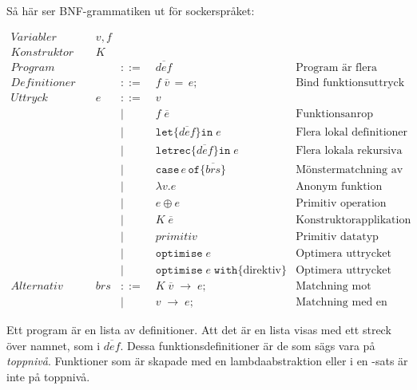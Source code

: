 \documentclass[Rapport]{subfiles}
\begin{document}
Så här ser BNF-grammatiken ut för sockerspråket:


\begin{equation*}
\begin{aligned}
Variabler \quad & v,f \\
Konstruktor \quad & K \\
Program \quad&&::=&\; \overline{def} 
        & \text{Program är flera definitioner}\\ 
Definitioner  \quad && ::=&\; f \; \overline{v} \, \mathtt{=} \, e \mathtt{;} 
        & \text {Bind funktionsuttryck}\\
Uttryck \quad & e &::=&\;  v \\
       &&|&\; f \; \overline{e}  
            & \text{Funktionsanrop} \\ 
       &&|&\; \mathtt{let \{} \overline{def} \mathtt{\} in }\; e 
            & \text{Flera lokal definitioner}\\
       &&|&\; \mathtt{letrec \{} \overline{def} \mathtt{\} in} \; e 
            & \text{Flera lokala rekursiva definitioner} \\
       &&|&\; \mathtt{case} \, e \, \mathtt{of \{} \overline{brs} \mathtt{\}} 
            & \text{Mönstermatchning av uttryck} \\
       &&|&\; \mathtt{\lambda } v \mathtt{.} e
            & \text{Anonym funktion} \\
       &&|&\; e \oplus e 
            & \text{Primitiv operation}\\ 
       &&|&\; K \; \overline{e} 
            & \text{Konstruktorapplikation} \\
       &&|&\; primitiv 
            & \text{Primitiv datatyp} \\
       &&|&\; \mathtt{optimise} \; e 
            & \text{Optimera uttrycket} \\
       &&|&\; \mathtt{optimise } \; e \; \mathtt{ with \{} \text{direktiv} \} 
            & \text{Optimera uttrycket} \\
Alternativ \quad & brs &::=&\; K \; \overline{v} \; \mathtt{\rightarrow} \; e \mathtt{;} 
            & \text{Matchning mot konstruktor} \\
         &&|&\; v \; \mathtt{\rightarrow} \; e \mathtt{;}
            & \text{Matchning med en variabel}
\end{aligned}
\end{equation*}


Ett program är en lista av definitioner. Att det är en lista visas med ett
streck över namnet, som i $\overline{def}$.
Dessa funktionsdefinitioner är de som sägs vara på \emph{toppnivå}. Funktioner som är 
skapade med en lambdaabstraktion eller i en -sats är inte på toppnivå. 
\end{document}
